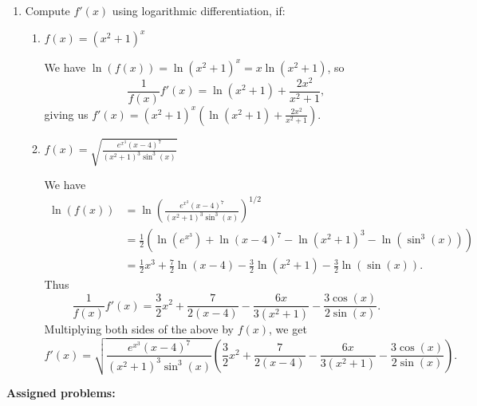 \documentclass[12pt]{article}
\newcommand{\di}{\displaystyle}
\begin{document}
\begin{enumerate}
\item Compute $f'(x)$ using logarithmic differentiation, if:

\begin{enumerate}
\item $\di f(x)=(x^2+1)^x$

We have $\ln(f(x)) = \ln(x^2+1)^x = x\ln(x^2+1)$, so
\[
\frac{1}{f(x)}f'(x) = \ln(x^2+1)+\frac{2x^2}{x^2+1},
\]
giving us $\di f'(x) = (x^2+1)^x\left(\ln(x^2+1)+\frac{2x^2}{x^2+1}\right)$.

\item $\di f(x)=\sqrt{\frac{e^{x^3}(x-4)^7}{(x^2+1)^3\sin^3(x)}}$

We have
\begin{align*}
\ln(f(x)) &= \ln\left(\frac{e^{x^3}(x-4)^7}{(x^2+1)^3\sin^3(x)}\right)^{1/2}\\
& = \frac12\left(\ln(e^{x^3})+\ln(x-4)^7-\ln(x^2+1)^3-\ln(\sin^3(x))\right)\\
& = \frac12 x^3+\frac72 \ln(x-4)-\frac32 \ln(x^2+1)-\frac32\ln(\sin(x)).
\end{align*}
Thus
\[
\frac{1}{f(x)}f'(x) = \frac32 x^2+\frac{7}{2(x-4)}-\frac{6x}{3(x^2+1)}-\frac{3\cos(x)}{2\sin(x)}.
\]
Multiplying both sides of the above by $f(x)$, we get
\[
f'(x) = \sqrt{\frac{e^{x^3}(x-4)^7}{(x^2+1)^3\sin^3(x)}}\left(\frac32 x^2+\frac{7}{2(x-4)}-\frac{6x}{3(x^2+1)}-\frac{3\cos(x)}{2\sin(x)}\right).
\]
\end{enumerate}

\end{enumerate}



\newpage
\textbf{Assigned problems:}
\end{document}
